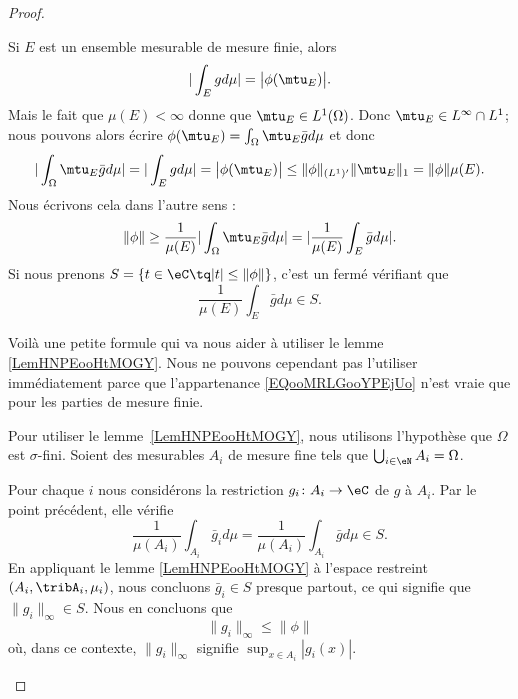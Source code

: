 \begin{proof}
\begin{subproof}
    \spitem[Si \( p=1\), une formule]
    Si \( E\) est un ensemble mesurable de mesure finie, alors
    \begin{equation}
        | \int_Egd\mu |=\big| \phi(\mtu_E) \big|.
    \end{equation}
    Mais le fait que \( \mu(E)<\infty\) donne que \( \mtu_E\in L^1(\Omega)\). Donc \( \mtu_E\in L^{\infty}\cap L^1\); nous pouvons alors écrire \( \phi(\mtu_E)=\int_{\Omega}\mtu_E\bar gd\mu\) et donc
    \begin{equation}    \label{EqUPCTooJvoKKI}
        | \int_{\Omega}\mtu_E\bar gd\mu |=|\int_Egd\mu |=\big| \phi(\mtu_E) \big|\leq \| \phi \|_{(L^1)'}\| \mtu_E \|_1=\| \phi \|\mu(E).
    \end{equation}
    Nous écrivons cela dans l'autre sens :
    \begin{equation}
        \| \phi \|\geq \frac{1}{ \mu(E) }| \int_{\Omega}\mtu_E\bar gd\mu |=| \frac{1}{ \mu(E) }\int_E\bar gd\mu |.
    \end{equation}
    Si nous prenons \( S=\{ t\in \eC\tq | t |\leq \| \phi \| \}\), c'est un fermé vérifiant que
    \begin{equation}        \label{EQooMRLGooYPEjUo}
        \frac{1}{ \mu(E) }\int_E\bar gd\mu\in S.
    \end{equation}

    Voilà une petite formule qui va nous aider à utiliser le lemme \ref{LemHNPEooHtMOGY}. Nous ne pouvons cependant pas l'utiliser immédiatement parce que l'appartenance \eqref{EQooMRLGooYPEjUo} n'est vraie que pour les parties de mesure finie.

    \spitem[Si \( p=1\), conclusion\cite{MonCerveau}]

    Pour utiliser le lemme~\ref{LemHNPEooHtMOGY}, nous utilisons l'hypothèse que \( \Omega\) est \( \sigma\)-fini. Soient des mesurables \( A_i\) de mesure fine tels que \( \bigcup_{i\in \eN}A_i=\Omega\).

    Pour chaque \( i\) nous considérons la restriction \( g_i\colon A_i\to \eC\) de \( g\) à \( A_i\). Par le point précédent, elle vérifie
    \begin{equation}
        \frac{1}{ \mu(A_i) }\int_{A_i}\bar g_id\mu=\frac{1}{ \mu(A_i) }\int_{A_i}\bar gd\mu\in S.
    \end{equation}
    En appliquant le lemme \ref{LemHNPEooHtMOGY} à l'espace restreint \( (A_i,\tribA_i,\mu_i)\), nous concluons \( \bar g_i\in S\) presque partout, ce qui signifie que \( \| g_i \|_{\infty}\in S\). Nous en concluons que
    \begin{equation}
        \| g_i \|_{\infty}\leq \| \phi \|
    \end{equation}
    où, dans ce contexte, \( \| g_i \|_{\infty}\) signifie \( \sup_{x\in A_i}| g_i(x) |\).


\end{subproof}
\end{proof}
